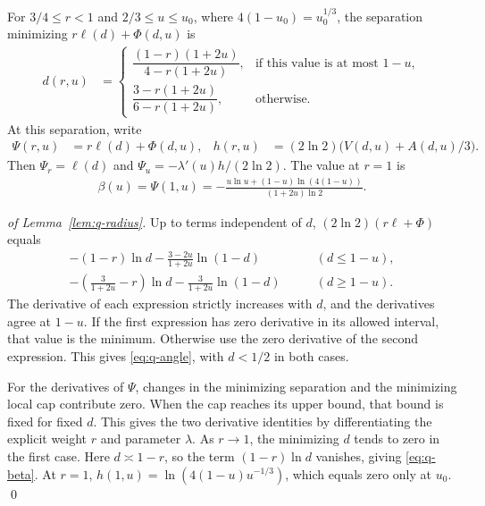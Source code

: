 \documentclass[runningheads,envcountsame,envcountsect,orivec]{llncs}
\begin{document}
\begin{lemma}
\label{lem:q-radius}
For $3/4\le r<1$ and $2/3\le u\le u_0$, where
$4(1-u_0)=u_0^{1/3}$, the separation minimizing
$r\ell(d)+\Phi(d,u)$ is
\begin{align}
 d(r,u)&=
 \begin{cases}
 \dfrac{(1-r)(1+2u)}{4-r(1+2u)},
    & \text{if this value is at most }1-u,\\[2mm]
 \dfrac{3-r(1+2u)}{6-r(1+2u)},&\text{otherwise}.
 \end{cases}
 \label{eq:q-angle}
\end{align}
At this separation, write
\begin{align}
 \Psi(r,u)&=r\ell(d)+\Phi(d,u),&
 h(r,u)&=(2\ln 2)\bigl(V(d,u)+A(d,u)/3\bigr).
 \label{eq:q-kernel}
\end{align}
Then $\Psi_r=\ell(d)$ and $\Psi_u=-\lambda'(u)h/(2\ln 2)$.
The value at $r=1$ is
\begin{align}
 \beta(u)=\Psi(1,u)
   =-\frac{u\ln u+(1-u)\ln(4(1-u))}{(1+2u)\ln 2}.
 \label{eq:q-beta}
\end{align}
\end{lemma}

\begin{proof}[of Lemma~\ref{lem:q-radius}]
Up to terms independent of $d$, $(2\ln 2)(r\ell+\Phi)$ equals
\begin{align*}
 -(1-r)\ln d-\frac{3-2u}{1+2u}\ln(1-d)
 &\qquad (d\le 1-u),\\
 -\left(\frac{3}{1+2u}-r\right)\ln d
       -\frac{3}{1+2u}\ln(1-d)
 &\qquad (d\ge 1-u).
\end{align*}
The derivative of each expression strictly increases with $d$,
and the derivatives agree at $1-u$. If the first expression has
zero derivative in its allowed interval, that value is the
minimum. Otherwise use the zero derivative of the second
expression. This gives \eqref{eq:q-angle},
with $d<1/2$ in both cases.

For the derivatives of $\Psi$, changes in the minimizing
separation and the minimizing local cap contribute zero. When the cap reaches its upper bound, that bound is fixed for fixed $d$. This gives
the two derivative identities by differentiating the explicit
weight $r$ and parameter $\lambda$. As $r\to1$, the minimizing
$d$ tends to zero in the first case. Here $d\asymp1-r$, so the term
$(1-r)\ln d$ vanishes, giving \eqref{eq:q-beta}. At $r=1$,
$h(1,u)=\ln(4(1-u)u^{-1/3})$, which equals zero only at $u_0$.
\qed
\end{proof}
\end{document}
